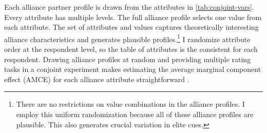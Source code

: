 \documentclass[12pt]{article}
\begin{document}
Each alliance partner profile is drawn from the attributes in \autoref{tab:conjoint-vars}.
Every attribute has multiple levels.
The full alliance profile selects one value from each attribute. 
The set of attributes and values captures theoretically interesting alliance characteristics and generates plausible profiles.\footnote{There are no restrictions on value combinations in the alliance profiles. I employ this uniform randomization because all of these alliance profiles are plausible. This also generates crucial variation in elite cues.}
I randomize attribute order at the respondent level, so the table of attributes is the consistent for each respondent. 
Drawing alliance profiles at random and providing multiple rating tasks in a conjoint experiment makes estimating the average marginal component effect (AMCE) for each alliance attribute straightforward \citep{Hainmuelleretal2014}. 
\end{document}
